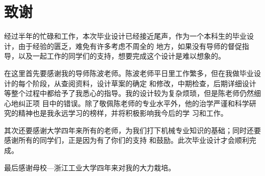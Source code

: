 
\chapter{\heiti\bfseries{致谢}}
经过半年的忙碌和工作，本次毕业设计已经接近尾声，作为一个本科生的毕业设计，由于经验的匮乏，难免有许多考虑不周全的
地方，如果没有导师的督促指导，以及一起工作的同学们的支持，想要完成这个设计是难以想象的。

在这里首先要感谢我的导师陈波老师。陈波老师平日里工作繁多，但在我做毕业设计的每个阶段，从查阅资料，设计草案的确定
和修改，中期检查，后期详细设计等整个过程中都给予了我悉心的指导。我的设计较为复杂烦琐，但是陈老师仍然细心地纠正项
目中的错误。除了敬佩陈老师的专业水平外，他的治学严谨和科学研究的精神也是我永远学习的榜样，并将积极影响我今后的学
习和工作。

其次还要感谢大学四年来所有的老师，为我们打下机械专业知识的基础；同时还要感谢所有的同学们，正是因为有了你们的支持
和鼓励。此次毕业设计才会顺利完成。  

    最后感谢母校—浙江工业大学四年来对我的大力栽培。



